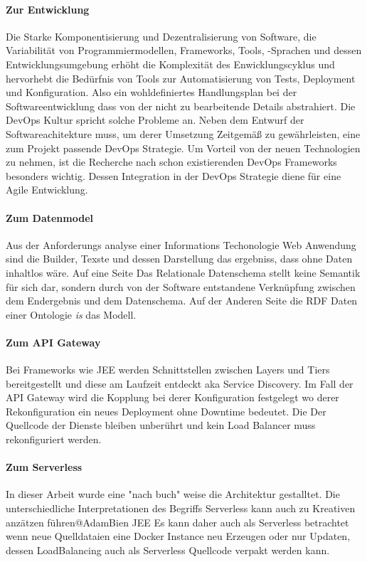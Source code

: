 \documentclass[
12pt,
english,
ngerman,
headsepline,
twoside,
openright,
numbers=noenddot,version=first
]{scrreprt}
\begin{document}
\paragraph{Zur Entwicklung}
Die Starke Komponentisierung und Dezentralisierung von Software, die Variabilität von Programmiermodellen, Frameworks, Tools, -Sprachen und dessen Entwicklungsumgebung erhöht die Komplexität des Enwicklungscyklus und hervorhebt die Bedürfnis von Tools zur Automatisierung von Tests, Deployment und Konfiguration. Also ein wohldefiniertes Handlungsplan bei der Softwareentwicklung dass von der nicht zu bearbeitende Details abstrahiert. 
Die DevOps Kultur spricht solche Probleme an. Neben dem Entwurf der Softwareachitekture  muss, um derer Umsetzung Zeitgemäß zu gewährleisten, eine zum Projekt passende DevOps Strategie.
Um Vorteil von der neuen Technologien zu nehmen, ist die Recherche nach schon existierenden DevOps Frameworks besonders wichtig. Dessen Integration in der DevOps Strategie diene für eine Agile Entwicklung.

\paragraph{Zum Datenmodel}
Aus der Anforderungs analyse einer Informations Techonologie Web Anwendung sind die Builder, Texste und dessen Darstellung das ergebniss, dass ohne Daten inhaltlos wäre. Auf eine Seite Das Relationale Datenschema stellt keine Semantik für sich dar, sondern durch von der Software entstandene Verknüpfung zwischen dem Endergebnis und dem Datenschema. Auf der Anderen Seite die  RDF Daten einer Ontologie \textit{is} das Modell.

\paragraph{Zum API Gateway}
Bei Frameworks wie JEE werden Schnittstellen zwischen Layers und Tiers bereitgestellt und diese am Laufzeit entdeckt aka Service Discovery. 
Im Fall der API Gateway wird die Kopplung bei derer Konfiguration festgelegt wo derer Rekonfiguration ein neues Deployment ohne Downtime bedeutet. Die Der Quellcode der Dienste bleiben unberührt und kein Load Balancer muss rekonfiguriert werden. 


\paragraph{Zum Serverless}
In dieser Arbeit wurde eine "nach buch" weise die Architektur gestalltet. Die unterschiedliche Interpretationen des Begriffs Serverless kann auch zu Kreativen anzätzen führen@AdamBien JEE
Es kann daher auch als Serverless betrachtet wenn neue Quelldataien eine Docker Instance neu Erzeugen oder nur Updaten, dessen LoadBalancing auch als Serverless Quellcode verpakt werden kann. 
\end{document}

